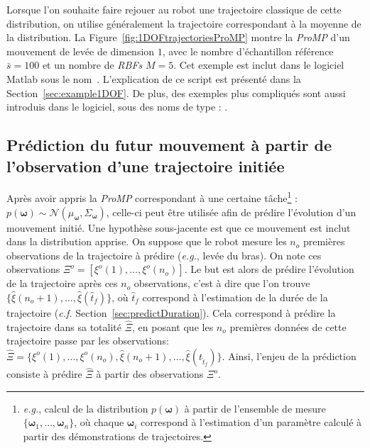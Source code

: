 \documentclass[utf8]{frontiersSCNS} %
\newcommand{\todo}[1]{\textcolor{red}{\textbf{/*#1*/}}}
\begin{document}
Lorsque l'on souhaite faire rejouer au robot une trajectoire classique de cette distribution, on utilise généralement la trajectoire correspondant à la moyenne de la distribution. La Figure~\ref{fig:1DOFtrajectoriesProMP} montre la \textit{ProMP} d'un mouvement de levée de dimension $1$, avec le nombre d'échantillon référence $\bar{s}=100$ et un nombre de \textit{RBFs} $M=5$. %
Cet exemple est inclut dans le logiciel Matlab sous le nom~. L'explication de ce script est présenté dans la Section~\ref{sec:example1DOF}. De plus, des exemples plus compliqués sont aussi introduis dans le logiciel, sous des noms de type : .




\subsection{Prédiction du futur mouvement à partir de l'observation d'une trajectoire initiée} \label{sec:predict}

Après avoir appris la \textit{ProMP} correspondant à une certaine tâche\footnote{\textit{e.g.}, calcul de la distribution $p(\boldsymbol{\omega})$ à partir de l'ensemble de mesure $\{\boldsymbol{\omega}_1, \ldots, \boldsymbol{\omega}_n\}$, où chaque $\boldsymbol{\omega}_i$ correspond à l'estimation d'un paramètre calculé à partir des démonstrations de trajectoires.} :  $p(\boldsymbol{\omega}) \sim \mathcal{N}(\mu_{\boldsymbol{\omega}}, \Sigma_{\boldsymbol{\omega}})$, celle-ci peut être utilisée afin de prédire l'évolution d'un mouvement initié. Une hypothèse sous-jacente est que ce mouvement est inclut dans la distribution apprise.
On suppose que le robot mesure les $n_o$ premières observations de la trajectoire à prédire (\textit{e.g.}, levée du bras). On note ces observations $\Xi^o=[\xi^o(1),\ldots, \xi^o({n_o})].$
Le but est alors de prédire l'évolution de la trajectoire après ces ${n_o}$ observations, c'est à dire que l'on trouve $\{\hat{\xi}({n_o+1}),\ldots,\hat{\xi}(\hat{t}_f)\}$, où $\hat{t}_f$ correspond à l'estimation de la durée de la trajectoire (\textit{c.f.} Section~\ref{sec:predictDuration}). 
Cela correspond à prédire la trajectoire dans sa totalité $\hat{\Xi}$, en posant que les $n_o$ premières données de cette trajectoire passe par les  observations: $\hat{\Xi} = \{\xi^o({1}), \ldots, \xi^o({n_o}), \hat{\xi}({n_o+1}), \ldots, \hat{\xi}(t_{\hat{t}_f})\}$.
Ainsi, l'enjeu de la prédiction consiste à prédire $\hat{\Xi}$ à partir des observations $\Xi^o$. 
\end{document}
